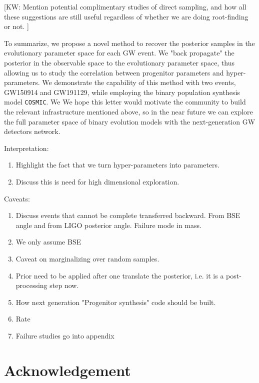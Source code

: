 \documentclass[twocolumn]{aastex631}
\newcommand{\kw}[1]{{\color{rb4}[KW: #1 ]}}
\begin{document}
\kw{Mention potential complimentary studies of direct sampling, and how all these suggestions are still useful regardless of whether we are doing root-finding or not.}

To summarize, we propose a novel method to recover the posterior samples in the evolutionary parameter space for each GW event.
We "back propagate" the posterior in the observable space to the evolutionary parameter space,
thus allowing us to study the correlation between progenitor parameters and hyper-parameters.
We demonstrate the capability of this method with two events, GW150914 and GW191129, while employing the binary population synthesis model \texttt{COSMIC}.
We 
We hope this letter would motivate the community to build the relevant infrastructure mentioned above,
so in the near future we can explore the full parameter space of binary evolution models with the next-generation GW detectors network.


Interpretation:
\begin{enumerate}
\item Highlight the fact that we turn hyper-parameters into parameters.
\item Discuss this is need for high dimensional exploration.
\end{enumerate}

Caveats: 
\begin{enumerate}
\item Discuss events that cannot be complete transferred backward. From BSE angle and from LIGO posterior angle. Failure mode in mass.
\item We only assume BSE
\item Caveat on marginalizing over random samples.
\item Prior need to be applied after one translate the posterior, i.e. it is a post-processing step now.
\item How next generation "Progenitor synthesis" code should be built.
\item Rate
\item Failure studies go into appendix
\end{enumerate}

\section{Acknowledgement}
\end{document}
